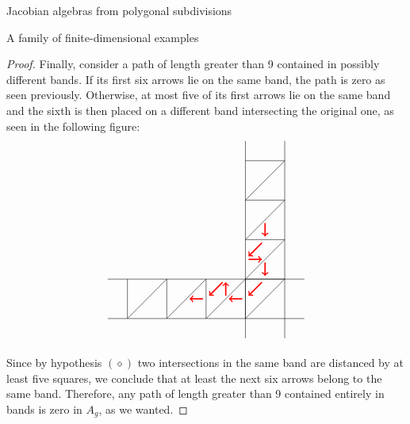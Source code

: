 \begin{chapter}{Jacobian algebras from polygonal subdivisions}
\begin{section}{A family of finite-dimensional examples}
\begin{proof}
Finally, consider a path of length greater than 9 contained in possibly different bands. If its first six arrows lie on the same band, the path is zero as seen previously. Otherwise, at most five of its first arrows lie on the same band and the sixth is then placed on a different band intersecting the original one, as seen in the following figure:
\[
\begin{tikzpicture}
\draw (-3.5*1.25, 0) -- (1.5*1.25, 0);
\draw (-3.5*1.25, -1.25) -- (1.5*1.25, -1.25);
\draw (0,3.5*1.25) -- (0,-1.5*1.25);
\draw (1.25,3.5*1.25) -- (1.25,-1.5*1.25);

\foreach \x in {-3.75,-2.5,...,0}
{
\draw (\x,-1.25) -- (\x+1.25, 0);
\draw (0, -\x) -- (1.25, -\x);
\draw (\x,0) -- (\x, -1.25);
}

\foreach \x in {0,1.25,...,2.5}
\draw (0, \x) -- (1.25, \x+1.25);

\draw[->, red, very thick] (0.5*1.25, 1.5*1.25 - 0.1) -- (0.5*1.25, 1.25 + 0.1);
\draw[->, red, very thick] (0.5*1.25 - 0.1, 1.25-0.1) -- (0.1, 0.5*1.25+0.1);
\draw[->, red, very thick] (0.1, 0.5*1.25) -- (0.5*1.25 - 0.1, 0.5*1.25);
\draw[->, red, very thick] (0.5*1.25, 0.5*1.25-0.1) -- (0.5*1.25, 0.1);
\draw[->, red, very thick] (0.5*1.25 - 0.1, -0.1) -- (0.1, -0.5*1.25+0.1);
\draw[->, red, very thick] (-0.1, -0.5*1.25) -- (-0.5*1.25+0.1, -0.5*1.25);
\draw[->, red, very thick] (-0.5*1.25, -0.5*1.25+0.1) -- (-0.5*1.25, -0.1);
\draw[->, red, very thick] (-0.5*1.25 - 0.1, -0.1) -- (-1.25 + 0.1, -0.5*1.25+0.1);
\draw[->, red, very thick] (-1.25 -0.1, -0.5*1.25) -- (-1.5*1.25+0.1, -0.5*1.25);
\end{tikzpicture}
\]

Since by hypothesis \hyperref[diamondhyp]{$(\diamond)$} two intersections in the same band are distanced by at least five squares, we conclude that at least the next six arrows belong to the same band. Therefore, any path of length greater than 9 contained entirely in bands is zero in $A_g$, as we wanted.
\end{proof}


\end{section}
\end{chapter}
